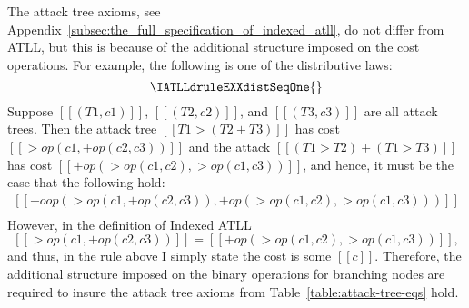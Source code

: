 The attack tree axioms, see
Appendix~\ref{subsec:the_full_specification_of_indexed_atll}, do not
differ from ATLL, but this is because of the additional structure
imposed on the cost operations.  For example, the following is one of
the distributive laws:
\[
\IATLLdruleEXXdistSeqOne{}
\]
Suppose $[[(T1,c1)]]$, $[[(T2,c2)]]$, and $[[(T3,c3)]]$ are all attack
trees.  Then the attack tree $[[T1 > (T2 + T3)]]$ has cost
$[[>op(c1,+op(c2,c3))]]$ and the attack $[[(T1 > T2) + (T1 > T3)]]$ has
cost $[[+op(>op(c1,c2),>op(c1,c3))]]$, and hence, it must be the case
that the following hold:
\[
\begin{array}{lll}
  [[-oop(>op(c1,+op(c2,c3)),+op(>op(c1,c2),>op(c1,c3)))]]\\
  [[-oop(+op(>op(c1,c2),>op(c1,c3)),>op(c1,+op(c2,c3)))]]
\end{array}  
\]
However, in the definition of Indexed ATLL
\[ [[>op(c1,+op(c2,c3))]] = [[+op(>op(c1,c2),>op(c1,c3))]], \] and thus,
in the rule above I simply state the cost is some $[[c]]$.  Therefore,
the additional structure imposed on the binary operations for
branching nodes are required to insure the attack tree axioms
from Table~\ref{table:attack-tree-eqs} hold.


